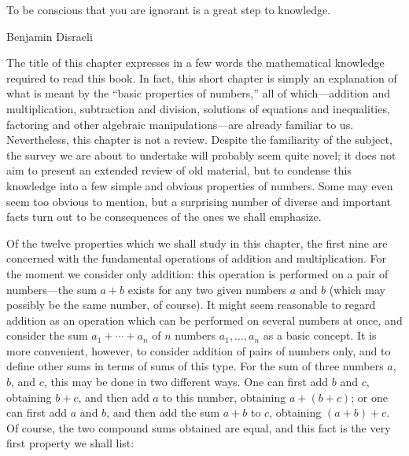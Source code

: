 %
%


\epigraph{%
  To be conscious that you are ignorant is a great step to knowledge.%
}{Benjamin Disraeli}


The title of this chapter expresses in a few words the mathematical knowledge
required to read this book. In fact, this short chapter is simply an
explanation of what is meant by the ``basic properties of numbers,'' all of
which---addition and multiplication, subtraction and division, solutions of
equations and inequalities, factoring and other algebraic manipulations---are
already familiar to us. Nevertheless, this chapter is not a review. Despite
the familiarity of the subject, the survey we are about to undertake will
probably seem quite novel; it does not aim to present an extended review of
old material, but to condense this knowledge into a few simple and obvious
properties of numbers. Some may even seem too obvious to mention, but a
surprising number of diverse and important facts turn out to be consequences
of the ones we shall emphasize.

Of the twelve properties which we shall study in this chapter, the first nine
are concerned with the fundamental operations of addition and multiplication.
For the moment we consider only addition: this operation is performed on a
pair of numbers---the sum $a+b$ exists for any two given numbers $a$ and $b$
(which may possibly be the same number, of course). It might seem reasonable
to regard addition as an operation which can be performed on several numbers
at once, and consider the sum $a_1 + \cdots + a_n$ of $n$ numbers
$a_1, \dots, a_n$ as a basic concept. It is more convenient, however, to
consider addition of pairs of numbers only, and to define other sums in terms
of sums of this type. For the sum of three numbers $a$, $b$, and $c$, this
may be done in two different ways. One can first add $b$ and $c$, obtaining
$b+c$, and then add $a$ to this number, obtaining $a+(b+c)$; or one can first
add $a$ and $b$, and then add the sum $a+b$ to $c$, obtaining $(a+b)+c$. Of
course, the two compound sums obtained are equal, and this fact is the very
first property we shall list:


